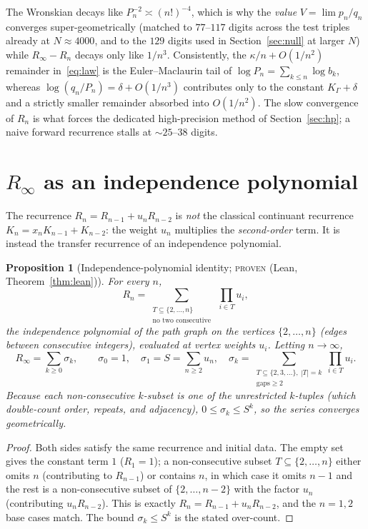 \documentclass[11pt]{article}
\newtheorem{proposition}{Proposition}
\newcommand{\Rinf}{R_\infty}
\begin{document}
The Wronskian decays like $P_n^{-2}\asymp(n!)^{-4}$, which is why the
\emph{value} $V=\lim p_n/q_n$ converges super-geometrically (matched to
$77$--$117$ digits across the test triples already at $N\approx4000$, and to the
$129$ digits used in Section~\ref{sec:null} at larger $N$) while $\Rinf-R_n$ decays
only like $1/n^3$. Consistently, the $\kappa/n+O(1/n^2)$ remainder in~\eqref{eq:law}
is the Euler--Maclaurin tail of $\log P_n=\sum_{k\le n}\log b_k$, whereas
$\log(q_n/P_n)=\delta+O(1/n^3)$ contributes only to the constant $K_\Gamma+\delta$
and a strictly smaller remainder absorbed into $O(1/n^2)$. The slow convergence of $R_n$ is what forces the dedicated high-precision
method of Section~\ref{sec:hp}; a naive forward recurrence stalls at $\sim25$--$38$
digits.

\section{$\Rinf$ as an independence polynomial}\label{sec:indpoly}

The recurrence $R_n=R_{n-1}+u_nR_{n-2}$ is \emph{not} the classical continuant
recurrence $K_n=x_nK_{n-1}+K_{n-2}$: the weight $u_n$ multiplies the
\emph{second-order} term. It is instead the transfer recurrence of an independence
polynomial.

\begin{proposition}[Independence-polynomial identity; \textsc{proven}
(Lean, Theorem~\ref{thm:lean})]\label{prop:indpoly}
For every $n$,
\[
  R_n=\sum_{\substack{T\subseteq\{2,\dots,n\}\\ \text{no two consecutive}}}
       \ \prod_{i\in T}u_i,
\]
the independence polynomial of the path graph on the vertices $\{2,\dots,n\}$
(edges between consecutive integers), evaluated at vertex weights $u_i$. Letting
$n\to\infty$,
\begin{equation}\label{eq:cluster}
  \Rinf=\sum_{k\ge0}\sigma_k,\qquad
  \sigma_0=1,\quad \sigma_1=S=\sum_{n\ge2}u_n,\quad
  \sigma_k=\!\!\sum_{\substack{T\subseteq\{2,3,\dots\},\ |T|=k\\ \text{gaps}\ge2}}
            \prod_{i\in T}u_i .
\end{equation}
Because each non-consecutive $k$-subset is one of the unrestricted $k$-tuples
(which double-count order, repeats, and adjacency), $0\le\sigma_k\le S^k$, so the
series converges geometrically.
\end{proposition}

\begin{proof}
Both sides satisfy the same recurrence and initial data. The empty set gives the
constant term $1$ ($R_1=1$); a non-consecutive subset $T\subseteq\{2,\dots,n\}$
either omits $n$ (contributing to $R_{n-1}$) or contains $n$, in which case it omits
$n-1$ and the rest is a non-consecutive subset of $\{2,\dots,n-2\}$ with the factor
$u_n$ (contributing $u_nR_{n-2}$). This is exactly $R_n=R_{n-1}+u_nR_{n-2}$, and the
$n=1,2$ base cases match. The bound $\sigma_k\le S^k$ is the stated over-count.
\end{proof}
\end{document}

